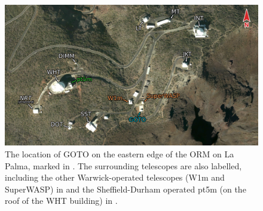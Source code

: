 \begin{colsection}
\begin{colsection}
\begin{figure}[p]
    \begin{center}
        \includegraphics[width=\linewidth]{images/orm_east_labelled.png}
    \end{center}
    \caption[The location of GOTO on La Palma]{
        The location of GOTO on the eastern edge of the ORM on La Palma, marked in . The surrounding telescopes are also labelled, including the other Warwick-operated telescopes (W1m and SuperWASP) in  and the Sheffield-Durham operated pt5m (on the roof of the WHT building) in .
    }\label{fig:orm_east}
\end{figure}

\clearpage

\end{colsection}


\end{colsection}


\newpage
